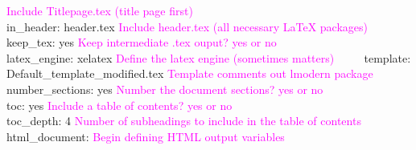 \documentclass[12pt,]{article}
\begin{document}
\textcolor{magenta}{Include Titlepage.tex (title page first)}\\
\hspace*{0.333em}\hspace*{0.333em}\hspace*{0.333em}\hspace*{0.333em}\hspace*{0.333em}\hspace*{0.333em}\hspace*{0.333em}
in\_header: header.tex
\textcolor{magenta}{Include header.tex (all necessary LaTeX packages)}\\
\hspace*{0.333em}\hspace*{0.333em}\hspace*{0.333em}\hspace*{0.333em}
keep\_tex: yes
\textcolor{magenta}{Keep intermediate .tex ouput? yes or no}\\
\hspace*{0.333em}\hspace*{0.333em}\hspace*{0.333em}\hspace*{0.333em}
latex\_engine: xelatex
\textcolor{magenta}{Define the latex engine (sometimes matters)} ~~~~
template: Default\_template\_modified.tex
\textcolor{magenta}{Template comments out lmodern package} ~~~~
number\_sections: yes
\textcolor{magenta}{Number the document sections? yes or no}\\
\hspace*{0.333em}\hspace*{0.333em}\hspace*{0.333em}\hspace*{0.333em}
toc: yes \textcolor{magenta}{Include a table of contents? yes or no}\\
\hspace*{0.333em}\hspace*{0.333em}\hspace*{0.333em}\hspace*{0.333em}
toc\_depth: 4
\textcolor{magenta}{Number of subheadings to include in the table of contents}\\
\hspace*{0.333em}\hspace*{0.333em} html\_document:
\textcolor{magenta}{Begin defining HTML output variables}\\
\hspace*{0.333em}\hspace*{0.333em}\hspace*{0.333em}\hspace*{0.333em}
\end{document}
